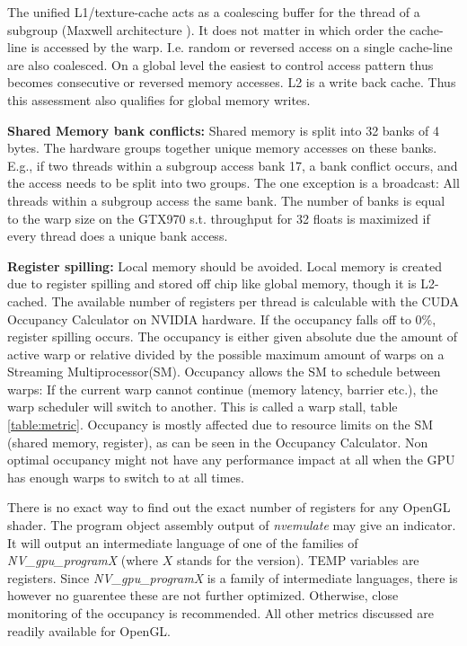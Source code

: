 \documentclass[m,times]{cgMA}
\begin{document}
The unified L1/texture-cache acts as a coalescing buffer for the thread of a subgroup (Maxwell architecture \cite{NVIDIA:MAXWELL}). It does not matter in which order the cache-line is accessed by the warp. I.e. random or reversed access on a single cache-line are also coalesced. On a global level the easiest to control access pattern thus becomes consecutive or reversed memory accesses. L2 is a write back cache. Thus this assessment also qualifies for global memory writes. \cite{NVIDIA:MEMORY_BAND}


\textbf{Shared Memory bank conflicts:} Shared memory is split into 32 banks of 4 bytes. The hardware groups together unique memory accesses on these banks. E.g., if two threads within a subgroup access bank 17, a bank conflict occurs, and the access needs to be split into two groups. The one exception is a broadcast: All threads within a subgroup access the same bank. The number of banks is equal to the warp size on the GTX970 s.t. throughput for 32 floats is maximized if every thread does a unique bank access. \cite{NVIDIA:BEST:PRACTICE}


\textbf{Register spilling:} Local memory should be avoided. Local memory is created due to register spilling and stored off chip like global memory, though it is L2-cached. The available number of registers per thread is calculable with the CUDA Occupancy Calculator \cite{NVIDIA:OCCUPANCY} on NVIDIA hardware. If the occupancy falls off to 0\%, register spilling occurs. The occupancy is either given absolute due the amount of active warp or relative divided by the possible maximum amount of warps on a Streaming Multiprocessor(SM). Occupancy allows the SM to schedule between warps: If the current warp cannot continue (memory latency, barrier etc.), the warp scheduler will switch to another. This is called a warp stall, table \ref{table:metric}. Occupancy is mostly affected due to resource limits on the SM (shared memory, register), as can be seen in the Occupancy Calculator. Non optimal occupancy might not have any performance impact at all when the GPU has enough warps to switch to at all times. \cite{NVIDIA:ACHIEVED_OCCUPANCY}

There is no exact way to find out the exact number of registers for any OpenGL shader. The program object assembly output of \textit{nvemulate} \cite{NVIDIA:EMULATE} may give an indicator. It will output an intermediate language of one of the families of \textit{NV\_gpu\_\-programX} (where $X$ stands for the version). TEMP variables are registers. Since \textit{NV\_gpu\_programX} is a family of intermediate languages, there is however no guarentee these are not further optimized. Otherwise, close monitoring of the occupancy is recommended. All other metrics discussed are readily available for OpenGL.
\end{document}
